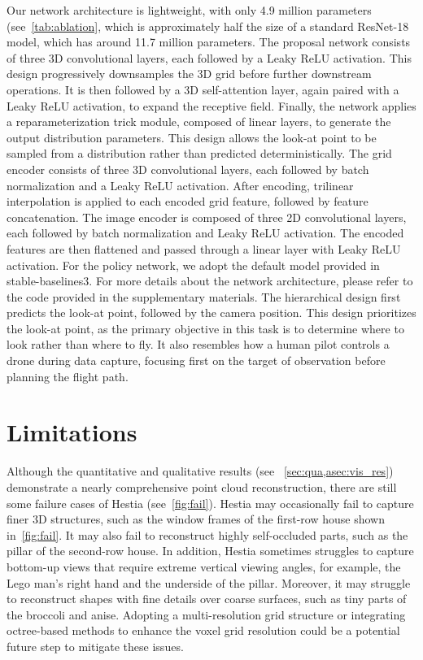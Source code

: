 Our network architecture is lightweight, with only 4.9 million parameters (see~\cref{tab:ablation}, which is approximately half the size of a standard ResNet-18 model, which has around 11.7 million parameters.
The proposal network consists of three 3D convolutional layers, each followed by a Leaky ReLU activation.
This design progressively downsamples the 3D grid before further downstream operations.
It is then followed by a 3D self-attention layer, again paired with a Leaky ReLU activation, to expand the receptive field.
Finally, the network applies a reparameterization trick module, composed of linear layers, to generate the output distribution parameters.
This design allows the look-at point to be sampled from a distribution rather than predicted deterministically.
The grid encoder consists of three 3D convolutional layers, each followed by batch normalization and a Leaky ReLU activation.
After encoding, trilinear interpolation is applied to each encoded grid feature, followed by feature concatenation.
The image encoder is composed of three 2D convolutional layers, each followed by batch normalization and Leaky ReLU activation.
The encoded features are then flattened and passed through a linear layer with Leaky ReLU activation.
For the policy network, we adopt the default model provided in stable-baselines3.
For more details about the network architecture, please refer to the code provided in the supplementary materials.
The hierarchical design first predicts the look-at point, followed by the camera position.
This design prioritizes the look-at point, as the primary objective in this task is to determine where to look rather than where to fly.
It also resembles how a human pilot controls a drone during data capture, focusing first on the target of observation before planning the flight path.


\section{Limitations}
\label{asec:limit}

Although the quantitative and qualitative results (see ~\cref{sec:qua,asec:vis_res}) demonstrate a nearly comprehensive point cloud reconstruction, there are still some failure cases of Hestia (see~\cref{fig:fail}).
Hestia may occasionally fail to capture finer 3D structures, such as the window frames of the first-row house shown in~\cref{fig:fail}.
It may also fail to reconstruct highly self-occluded parts, such as the pillar of the second-row house.
In addition, Hestia sometimes struggles to capture bottom-up views that require extreme vertical viewing angles, for example, the Lego man's right hand and the underside of the pillar.
Moreover, it may struggle to reconstruct shapes with fine details over coarse surfaces, such as tiny parts of the broccoli and anise.
Adopting a multi-resolution grid structure or integrating octree-based methods to enhance the voxel grid resolution could be a potential future step to mitigate these issues.

